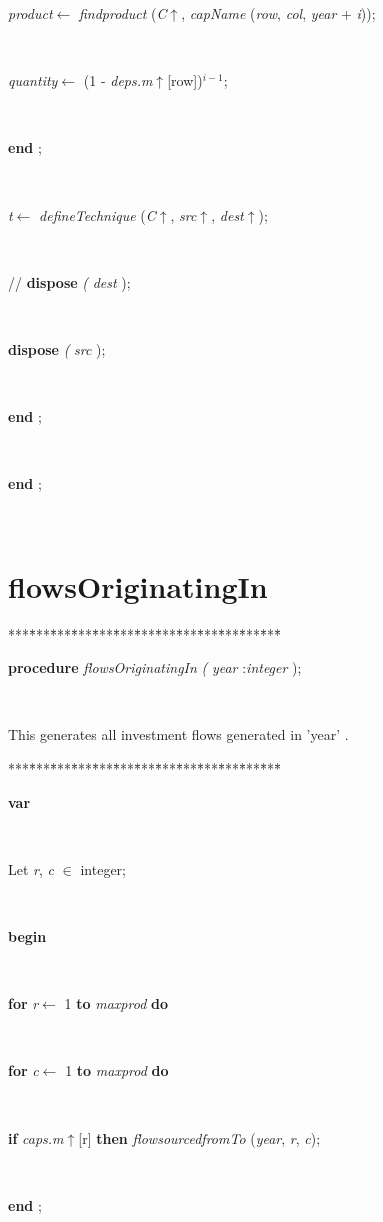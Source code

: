 \documentclass[10pt, a4paper]{article}
\begin{document}
\begin{tabbing}
\parbox{14cm}{\textsf{\textit{product}$\leftarrow$ \textit{findproduct} (\textit{C}$\uparrow$\textit{}, \textit{capName} (\textit{row}, \textit{col}, \textit{year} + \textit{i}))}; }\\
\parbox{14cm}{\textsf{\textit{quantity}$\leftarrow$ (1 - \textit{deps.m}$\uparrow$\textit{}[row])$^{i - 1}$}; }\\
\<\-\parbox{14cm}{\textsf{\textbf{end} ;}}\\
\parbox{14cm}{\textsf{\textit{t}$\leftarrow$ \textit{defineTechnique} (\textit{C}$\uparrow$\textit{}, \textit{src}$\uparrow$\textit{}, \textit{dest}$\uparrow$\textit{})}; }\\
\parbox{14cm}{\textsf{//   \textbf{dispose} \textit{(} \textit{dest} );}}\\
\parbox{14cm}{\textsf{\textbf{dispose} \textit{(} \textit{src} );}}\\
\<\-\<\-\parbox{14cm}{\textsf{\textbf{end} ;}}\\
\<\-\parbox{14cm}{\textsf{\textbf{end} ;}}\\
\end{tabbing}
\section{flowsOriginatingIn}\label{sec:harmonyplanflowsOriginatingIn}

\begin{tabbing}
***\=***\=***\=***\=***\=***\=***\=***\=***\=***\=***\=***\=***\=\kill
\parbox{14cm}{\textsf{\textbf{procedure}  \textit{flowsOriginatingIn} \textit{(} \textit{year} :\textit{integer} );}}\\
\end{tabbing}
This generates all investment flows generated in 'year' .
\begin{tabbing}
***\=***\=***\=***\=***\=***\=***\=***\=***\=***\=***\=***\=***\=\kill
\\
\+\parbox{14cm}{\textsf{\textbf{var} }}\\
\parbox{14cm}{\textsf{Let \textit{r}, \textit{c} $\in$ integer;}}\\
\-\<\+\parbox{14cm}{\textsf{\textbf{begin} }}\\
\+\parbox{14cm}{\textsf {\textbf {for } \textsf{\textit{r}$\leftarrow$ 1} \textbf{ to } \textsf{\textit{maxprod}} \textbf{ do } }}\\
\+\parbox{14cm}{\textsf {\textbf {for } \textsf{\textit{c}$\leftarrow$ 1} \textbf{ to } \textsf{\textit{maxprod}} \textbf{ do } }}\\
\-\-\parbox{14cm}{\textsf {\textbf {if } \textsf{\textit{caps.m}$\uparrow$\textit{}[r]} \textbf{ then } \textsf{\textit{flowsourcedfromTo} (\textit{year}, \textit{r}, \textit{c})}; }}\\
\<\-\parbox{14cm}{\textsf{\textbf{end} ;}}\\
\end{tabbing}
\end{document}
